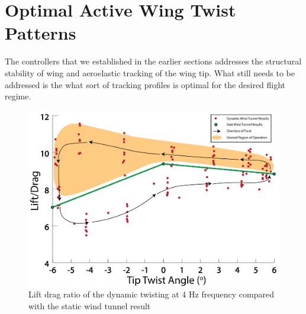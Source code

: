 \documentclass[11pt]{ucthesis}
\begin{document}





\section{Optimal Active Wing Twist Patterns}
The controllers that we established in the earlier sections addresses the structural stability of wing and aeroelastic tracking of the wing tip. What still needs to be addressed is the what sort of tracking profiles is optimal for the desired flight regime.

\begin{figure}[thpb]
\centering
\includegraphics[width=.8\linewidth]{./Figures/LD5454MotivationPlot.png}
\caption{Lift drag ratio of the dynamic twisting at 4 Hz frequency compared with the static wind tunnel result}
\label{fig:LDmot}
\end{figure}
\end{document}

